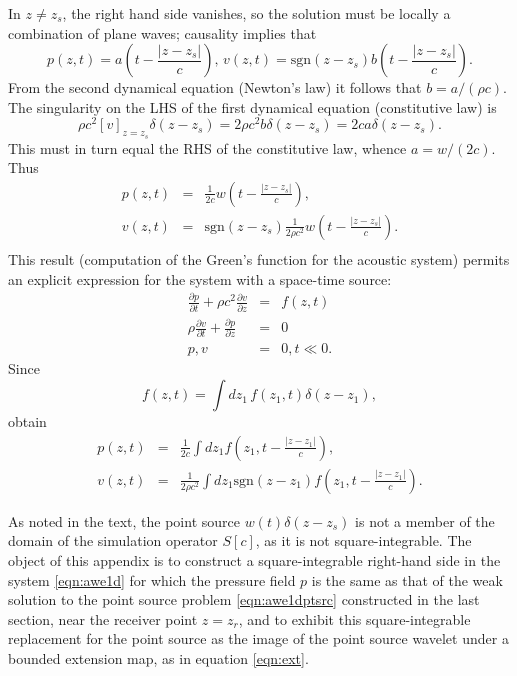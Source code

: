 In $z \ne z_s$, the right hand side 
vanishes, so the solution must be locally a combination of plane
waves; causality implies that
\[
p(z,t)=a\left(t -\frac{|z-z_s|}{c}\right), \, v(z,t)=\mbox{sgn}(z-z_s) b\left(t -
  \frac{|z-z_s|}{c}\right).
\]
From the second dynamical equation (Newton's law) it follows that $b =
a/(\rho c)$. The singularity on the LHS of the first dynamical
equation (constitutive law) is
\[
\rho c^2 [v]_{z=z_s}\delta(z-z_s) =
2\rho c^2 b\delta(z-z_s) = 2c a\delta(z-z_s).
\] 
This must in turn equal the RHS of the constitutive law, whence
$a=w/(2c)$. Thus
\begin{eqnarray}
\label{eqn:sol1dptsrc}
p(z,t) &=& \frac{1}{2c}w\left(t - \frac{|z-z_s|}{c}\right), \nonumber \\
v(z,t) &=& \mbox{sgn}(z-z_s)\frac{1}{2\rho c^2}w\left(t -\frac{|z-z_s|}{c}\right).
           \nonumber \\
\end{eqnarray}
This result (computation of the Green's function for the acoustic
system) permits an explicit expression for the system with a
space-time source:
\begin{eqnarray}
\label{eqn:awe1dapp}
\frac{\partial p}{\partial t} +\rho c^2\frac{\partial 
  v}{\partial z} &=& f(z,t) \nonumber\\
\rho \frac{\partial v}{\partial t} + \frac{\partial p}{\partial 
  z}&=&0\nonumber\\
 p,v&=&0, t \ll 0. 
\end{eqnarray}
Since
\[
  f(z,t) = \int dz_1\,f(z_1,t)\delta(z-z_1),
\]
obtain
\begin{eqnarray}
\label{eqn:sol1dp}
p(z,t) &=& \frac{1}{2c}\int dz_1 f\left(z_1,t -
           \frac{|z-z_1|}{c}\right), \\
  \label{eqn:sol1dv}
v(z,t) &=& \frac{1}{2\rho c^2} \int dz_1 \mbox{sgn} (z-z_1) f\left(z_1,t - \frac{|z-z_1|}{c}\right).
\end{eqnarray}


As noted in the text, the point source $w(t)\delta(z-z_s)$ is not a
member of the domain of the simulation operator $S[c]$, as it is not
square-integrable. The object of this appendix is to construct a square-integrable right-hand side in the
system \ref{eqn:awe1d} for which the pressure field $p$
is the same as that of the weak solution to the point source problem \ref{eqn:awe1dptsrc}
constructed in the last section, near the receiver point $z=z_r$, and
to exhibit this square-integrable replacement for the point source as
the image of the point source wavelet under a bounded extension map,
as in equation \ref{eqn:ext}.

